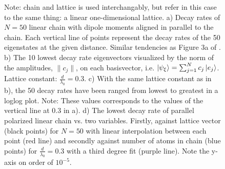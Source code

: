 \documentclass{article}
\begin{document}
\begin{figure}[H]
    \caption{Note: chain and lattice is used interchangably, but refer in this case to the same thing: a linear one-dimensional lattice. a) Decay rates of $N=50$ linear chain with dipole moments aligned in parallel to the chain. Each vertical line of points represent the decay rates of the 50 eigenstates at the given distance. Similar tendencies as Figure 3a of \cite{Asenjo}. b) The 10 lowest decay rate eigenvectors visualized by the norm of the amplitudes, $\| c_j \|$, on each basisvector, i.e. $\ket{\psi_\xi} = \sum_{j=1}^N c_j \ket{e_j}$. Lattice constant: $\frac{d}{\lambda_0} = 0.3$. c) With the same lattice constant as in b), the 50 decay rates have been ranged from lowest to greatest in a loglog plot. Note: These values corresponds to the values of the vertical line at 0.3 in a). d) The lowest decay rate of parallel polarized linear chain vs. two variables. Firstly, against lattice vector (black points) for $N=50$ with linear interpolation between each point (red line) and secondly against number of atoms in chain (blue points) for $\frac{d}{\lambda_0} = 0.3$ with a third degree fit (purple line). Note the y-axis on order of $10^{-5}$. }
    \label{fig:fig1}
\end{figure}
\end{document}
